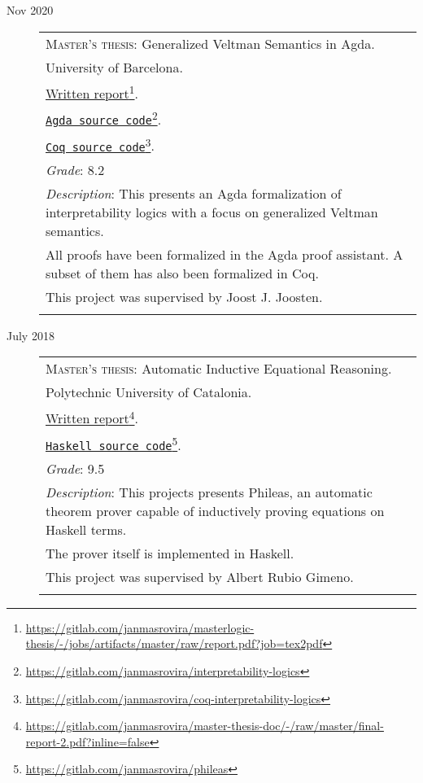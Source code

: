 \documentclass[a4paper,10pt]{article}
\newcommand{\fnlink}[2]{\href{#1}{#2}\footnote{\url{#1}}}
\begin{document}
\begin{description}
\item[Nov 2020]
\begin{minipage}{\textwidth}

  \begin{tabular}{|p{12cm}}

    \textsc{Master's thesis}: Generalized Veltman Semantics in Agda. \\
    University of Barcelona. \\
    \fnlink{https://gitlab.com/janmasrovira/masterlogic-thesis/-/jobs/artifacts/master/raw/report.pdf?job=tex2pdf}{Written report}. \\
    \fnlink{https://gitlab.com/janmasrovira/interpretability-logics}{\texttt{Agda source code}}. \\
    \fnlink{https://gitlab.com/janmasrovira/coq-interpretability-logics}{\texttt{Coq source code}}. \\
    \textit{Grade}: 8.2 \\
    \textit{Description}: This presents an Agda formalization of interpretability logics with a focus on generalized Veltman semantics.
    \\All proofs have been formalized in the Agda proof assistant. A subset of them has also been formalized in Coq.
    \\This project was supervised by Joost J. Joosten. \\
    \multicolumn{1}{c}{} \\

  \end{tabular}
\end{minipage}

\item[July 2018]
  \begin{minipage}{\textwidth}
    \begin{tabular}{|p{12cm}}
      \textsc{Master's thesis}: Automatic Inductive Equational Reasoning. \\
      Polytechnic University of Catalonia. \\
      \fnlink{https://gitlab.com/janmasrovira/master-thesis-doc/-/raw/master/final-report-2.pdf?inline=false}{Written report}. \\
      \fnlink{https://gitlab.com/janmasrovira/phileas}{\texttt{Haskell source code}}. \\
      \textit{Grade}: 9.5 \\
      \textit{Description}: This projects presents Phileas, an automatic
      theorem prover capable of inductively proving equations on Haskell
      terms.
      \\The prover itself is implemented in Haskell.
      \\This project was supervised by Albert Rubio Gimeno. \\
      \multicolumn{1}{c}{} \\

    \end{tabular}
  \end{minipage}

\end{description}
\end{document}
